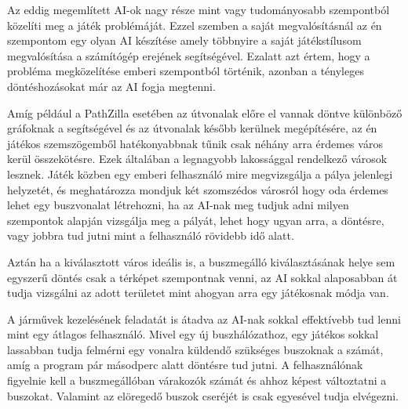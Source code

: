 
Az eddig megemlített AI-ok nagy része mint vagy tudományosabb szempontból közelíti meg a játék problémáját. Ezzel szemben a saját megvalósításnál az én szempontom egy olyan AI készítése amely többnyire a saját játékstílusom megvalósítása a számítógép erejének segítségével. Ezalatt azt értem, hogy a probléma megközelítése emberi szempontból történik, azonban a tényleges döntéshozásokat már az AI fogja megtenni.

Amíg például a PathZilla esetében az útvonalak előre el vannak döntve különböző gráfoknak a segítségével és az útvonalak később kerülnek megépítésére, az én játékos szemszögemből hatékonyabbnak tűnik csak néhány arra érdemes város kerül összekötésre. Ezek általában a legnagyobb lakossággal rendelkező városok lesznek. Játék közben egy emberi felhasználó mire megvizsgálja a pálya jelenlegi helyzetét, és meghatározza mondjuk két szomszédos városról hogy oda érdemes lehet egy buszvonalat létrehozni, ha az AI-nak meg tudjuk adni milyen szempontok alapján vizsgálja meg a pályát, lehet hogy ugyan arra, a döntésre, vagy jobbra tud jutni mint a felhasználó rövidebb idő alatt.

Aztán ha a kiválasztott város ideális is, a buszmegálló kiválasztásának helye sem egyszerű döntés csak a térképet szempontnak venni, az AI sokkal alaposabban át tudja vizsgálni az adott területet mint ahogyan arra egy játékosnak módja van.

A járművek kezelésének feladatát is átadva az AI-nak sokkal effektívebb tud lenni mint egy átlagos felhasználó. Mivel egy új buszhálózathoz, egy játékos sokkal lassabban tudja felmérni egy vonalra küldendő szükséges buszoknak a számát, amíg a program pár másodperc alatt döntésre tud jutni. A felhasználónak figyelnie kell a buszmegállóban várakozók számát és ahhoz képest változtatni a buszokat. Valamint az elöregedő buszok cseréjét is csak egyesével tudja elvégezni.
